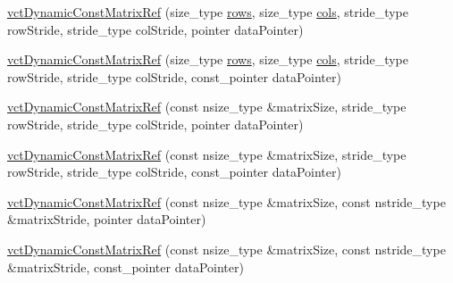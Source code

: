 \begin{DoxyCompactItemize}
\item 
\hyperlink{classvct_dynamic_const_matrix_ref_aad4b16cf2deb8b7c35610c7ec32dbb9b}{vct\+Dynamic\+Const\+Matrix\+Ref} (size\+\_\+type \hyperlink{classvct_dynamic_const_matrix_base_a5eac13be2207ebeb8766cde379d73438}{rows}, size\+\_\+type \hyperlink{classvct_dynamic_const_matrix_base_aa6c51d41a100da49a7e7ac7edb20ecd9}{cols}, stride\+\_\+type row\+Stride, stride\+\_\+type col\+Stride, pointer data\+Pointer)
\item 
\hyperlink{classvct_dynamic_const_matrix_ref_a7cc35b9428843e85624f1bce7098c89b}{vct\+Dynamic\+Const\+Matrix\+Ref} (size\+\_\+type \hyperlink{classvct_dynamic_const_matrix_base_a5eac13be2207ebeb8766cde379d73438}{rows}, size\+\_\+type \hyperlink{classvct_dynamic_const_matrix_base_aa6c51d41a100da49a7e7ac7edb20ecd9}{cols}, stride\+\_\+type row\+Stride, stride\+\_\+type col\+Stride, const\+\_\+pointer data\+Pointer)
\item 
\hyperlink{classvct_dynamic_const_matrix_ref_acc22ef717bf7922b0d2a21b27d21bd9a}{vct\+Dynamic\+Const\+Matrix\+Ref} (const nsize\+\_\+type \&matrix\+Size, stride\+\_\+type row\+Stride, stride\+\_\+type col\+Stride, pointer data\+Pointer)
\item 
\hyperlink{classvct_dynamic_const_matrix_ref_abc8c732c965cff7bd449bcdffd7932dc}{vct\+Dynamic\+Const\+Matrix\+Ref} (const nsize\+\_\+type \&matrix\+Size, stride\+\_\+type row\+Stride, stride\+\_\+type col\+Stride, const\+\_\+pointer data\+Pointer)
\item 
\hyperlink{classvct_dynamic_const_matrix_ref_ac09a3ad8850cfc2f747179cbd0e290ce}{vct\+Dynamic\+Const\+Matrix\+Ref} (const nsize\+\_\+type \&matrix\+Size, const nstride\+\_\+type \&matrix\+Stride, pointer data\+Pointer)
\item 
\hyperlink{classvct_dynamic_const_matrix_ref_aadff1c2bde72946b9daa305f7159e240}{vct\+Dynamic\+Const\+Matrix\+Ref} (const nsize\+\_\+type \&matrix\+Size, const nstride\+\_\+type \&matrix\+Stride, const\+\_\+pointer data\+Pointer)
\end{DoxyCompactItemize}

